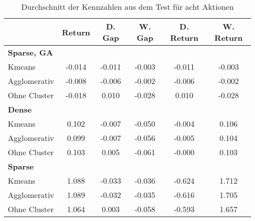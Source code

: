 \begin{table}[ht]
\centering
\caption{Durchschnitt der Kennzahlen aus dem Test für acht Aktionen}
\begin{tabular}{lccccc}
\hline
\textbf{} & \textbf{Return} & \textbf{D. Gap} & \textbf{W. Gap} & \textbf{D. Return} & \textbf{W. Return} \\
\hline
\multicolumn{6}{l}{\textbf{Sparse, GA}} \\
\hspace{1em}Kmeans & -0.014 & -0.011 & -0.003 & -0.011 & -0.003 \\
\hspace{1em}Agglomerativ & -0.008 & -0.006 & -0.002 & -0.006 & -0.002 \\
\hspace{1em}Ohne Cluster & -0.018 & 0.010 & -0.028 & 0.010 & -0.028 \\
\hline
\multicolumn{6}{l}{\textbf{Dense}} \\
\hspace{1em}Kmeans & 0.102 & -0.007 & -0.050 & -0.004 & 0.106 \\
\hspace{1em}Agglomerativ & 0.099 & -0.007 & -0.056 & -0.005 & 0.104 \\
\hspace{1em}Ohne Cluster & 0.103 & 0.005 & -0.061 & -0.000 & 0.103 \\
\hline
\multicolumn{6}{l}{\textbf{Sparse}} \\
\hspace{1em}Kmeans & 1.088 & -0.033 & -0.036 & -0.624 & 1.712 \\
\hspace{1em}Agglomerativ & 1.089 & -0.032 & -0.035 & -0.616 & 1.705 \\
\hspace{1em}Ohne Cluster & 1.064 & 0.003 & -0.058 & -0.593 & 1.657 \\
\hline
\end{tabular}
\end{table}








